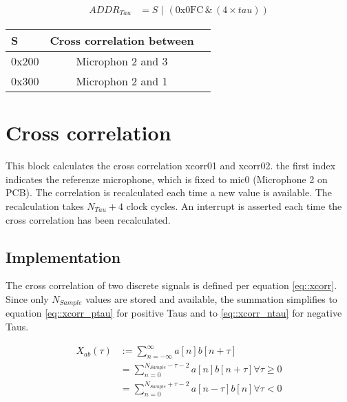 \begin{align}
	ADDR_{Tau} &= S\,\,|\,\, (\text{0x0FC}\, \&\, (4\times tau)) \label{eq:addr_calc}
\end{align}

\begin{table}[h]
	\centering
	\label{tbl::tau_addr}
	\begin{tabular}{|l|c|l|}
		\hline 
		S &  Cross correlation between \\
		\hline 
		0x200	&  Microphon 2 and 3\\
		\hline 
		0x300	&  Microphon 2 and 1\\
		\hline 
	\end{tabular} 
\end{table}

\section{Cross correlation}
\label{sec::cic}
This block calculates the cross correlation xcorr01 and xcorr02.
the first index indicates the referenze microphone, which is fixed to mic0 (Microphone 2 on PCB).
The correlation is recalculated each time a new value is available.
The recalculation takes $N_{Tau}+4$ clock cycles.
An interrupt is asserted each time the cross correlation has been recalculated.

\subsection{Implementation}
The cross correlation of two discrete signals is defined per equation \ref{eq::xcorr}.
Since only $N_{Sample}$ values are stored and available, the summation simplifies to equation \ref{eq::xcorr_ptau} for positive Taus and to \ref{eq::xcorr_ntau} for negative Taus.

\begin{align}
X_{ab}(\tau) &:= \sum_{n=-\infty}^{\infty}a\left[n\right]b\left[n+\tau\right] \label{eq::xcorr}\\
&= \sum_{n=0}^{N_{Sample}-\tau-2}a\left[n\right]b\left[n+\tau\right] \forall\tau\ge0 \label{eq::xcorr_ptau} \\
&= \sum_{n=0}^{N_{Sample}+\tau-2}a\left[n-\tau\right]b\left[n\right] \forall\tau<0 \label{eq::xcorr_ntau} \\	
\end{align}

